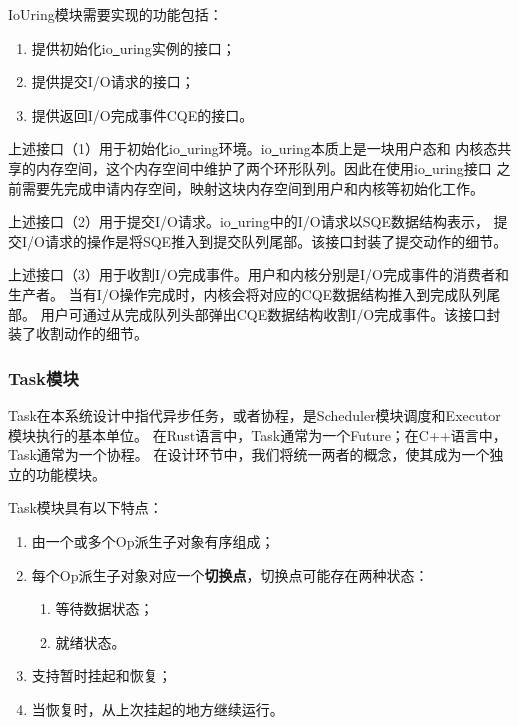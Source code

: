 \documentclass[supercite]{HustGraduPaper}
\theoremstyle{definition}
\begin{document}
IoUring模块需要实现的功能包括：

\begin{enumerate}
  \item 提供初始化io\underline{~}uring实例的接口；
  \item 提供提交I/O请求的接口；
  \item 提供返回I/O完成事件CQE的接口。
\end{enumerate}

上述接口（1）用于初始化io\underline{~}uring环境。io\underline{~}uring本质上是一块用户态和
内核态共享的内存空间，这个内存空间中维护了两个环形队列。因此在使用io\underline{~}uring接口
之前需要先完成申请内存空间，映射这块内存空间到用户和内核等初始化工作。\par

上述接口（2）用于提交I/O请求。io\underline{~}uring中的I/O请求以SQE数据结构表示，
提交I/O请求的操作是将SQE推入到提交队列尾部。该接口封装了提交动作的细节。\par

上述接口（3）用于收割I/O完成事件。用户和内核分别是I/O完成事件的消费者和生产者。
当有I/O操作完成时，内核会将对应的CQE数据结构推入到完成队列尾部。
用户可通过从完成队列头部弹出CQE数据结构收割I/O完成事件。该接口封装了收割动作的细节。\par

\subsubsection{Task模块}

Task在本系统设计中指代异步任务，或者协程，是Scheduler模块调度和Executor模块执行的基本单位。
在Rust语言中，Task通常为一个Future；在C++语言中，Task通常为一个协程。
在设计环节中，我们将统一两者的概念，使其成为一个独立的功能模块。\par

Task模块具有以下特点：
\begin{enumerate}
  \item 由一个或多个Op派生子对象有序组成；
  \item 每个Op派生子对象对应一个\textbf{切换点}，切换点可能存在两种状态：
    \begin{enumerate}
      \item 等待数据状态；
      \item 就绪状态。
    \end{enumerate}
  \item 支持暂时挂起和恢复；
  \item 当恢复时，从上次挂起的地方继续运行。
\end{enumerate}
\end{document}
